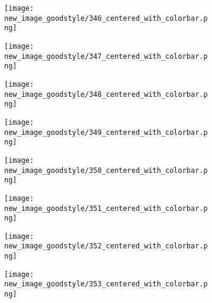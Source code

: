 \documentclass[a4paper,12pt]{article}
\begin{document}
\begin{figure}[H]
  \begin{subfigure}{0.11\textwidth}
    \texttt{[image: new\_image\_goodstyle/346\_centered\_with\_colorbar.png]}
  \end{subfigure}
  \hfill
  \begin{subfigure}{0.11\textwidth}
    \texttt{[image: new\_image\_goodstyle/347\_centered\_with\_colorbar.png]}
  \end{subfigure}
  \hfill
  \begin{subfigure}{0.11\textwidth}
    \texttt{[image: new\_image\_goodstyle/348\_centered\_with\_colorbar.png]}
  \end{subfigure}
  \hfill
  \begin{subfigure}{0.11\textwidth}
    \texttt{[image: new\_image\_goodstyle/349\_centered\_with\_colorbar.png]}
  \end{subfigure}
  \hfill
  \begin{subfigure}{0.11\textwidth}
    \texttt{[image: new\_image\_goodstyle/350\_centered\_with\_colorbar.png]}
  \end{subfigure}
  \hfill
  \begin{subfigure}{0.11\textwidth}
    \texttt{[image: new\_image\_goodstyle/351\_centered\_with\_colorbar.png]}
  \end{subfigure}
  \hfill
  \begin{subfigure}{0.11\textwidth}
    \texttt{[image: new\_image\_goodstyle/352\_centered\_with\_colorbar.png]}
  \end{subfigure}
  \hfill
  \begin{subfigure}{0.11\textwidth}
    \texttt{[image: new\_image\_goodstyle/353\_centered\_with\_colorbar.png]}
  \end{subfigure}
  \hfill
\end{figure}
\end{document}
